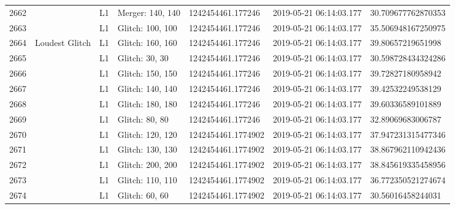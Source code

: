 \begin{longtable}{lllllll}
2662 &                                                    &       L1 &  Merger: 140, 140 &   1242454461.177246 &  2019-05-21 06:14:03.177 &  30.709677762870353 \\
2663 &                                                    &       L1 &  Glitch: 100, 100 &   1242454461.177246 &  2019-05-21 06:14:03.177 &  35.506948167250975 \\
2664 &                                     Loudest Glitch &       L1 &  Glitch: 160, 160 &   1242454461.177246 &  2019-05-21 06:14:03.177 &   39.80657219651998 \\
2665 &                                                    &       L1 &    Glitch: 30, 30 &   1242454461.177246 &  2019-05-21 06:14:03.177 &  30.598728434324286 \\
2666 &                                                    &       L1 &  Glitch: 150, 150 &   1242454461.177246 &  2019-05-21 06:14:03.177 &   39.72827180958942 \\
2667 &                                                    &       L1 &  Glitch: 140, 140 &   1242454461.177246 &  2019-05-21 06:14:03.177 &   39.42532249538129 \\
2668 &                                                    &       L1 &  Glitch: 180, 180 &   1242454461.177246 &  2019-05-21 06:14:03.177 &   39.60336589101889 \\
2669 &                                                    &       L1 &    Glitch: 80, 80 &   1242454461.177246 &  2019-05-21 06:14:03.177 &   32.89069683006787 \\
2670 &                                                    &       L1 &  Glitch: 120, 120 &  1242454461.1774902 &  2019-05-21 06:14:03.177 &  37.947231315477346 \\
2671 &                                                    &       L1 &  Glitch: 130, 130 &  1242454461.1774902 &  2019-05-21 06:14:03.177 &  38.867962110942436 \\
2672 &                                                    &       L1 &  Glitch: 200, 200 &  1242454461.1774902 &  2019-05-21 06:14:03.177 &  38.845619335458956 \\
2673 &                                                    &       L1 &  Glitch: 110, 110 &  1242454461.1774902 &  2019-05-21 06:14:03.177 &  36.772350521274674 \\
2674 &                                                    &       L1 &    Glitch: 60, 60 &  1242454461.1774902 &  2019-05-21 06:14:03.177 &   30.56016458244031 \\

\end{longtable}
